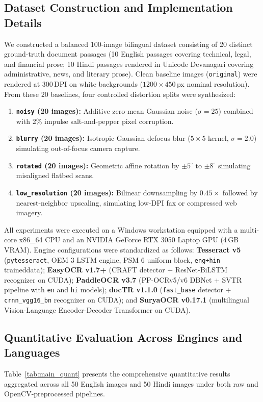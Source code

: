 \documentclass[11pt,a4paper]{article}
\begin{document}
\subsection{Dataset Construction and Implementation Details}
We constructed a balanced 100-image bilingual dataset consisting of 20 distinct ground-truth document passages (10 English passages covering technical, legal, and financial prose; 10 Hindi passages rendered in Unicode Devanagari covering administrative, news, and literary prose). Clean baseline images (\texttt{original}) were rendered at 300\,DPI on white backgrounds ($1200 \times 450$\,px nominal resolution). From these 20 baselines, four controlled distortion splits were synthesized:
\begin{enumerate}[leftmargin=1.5em]
    \item \textbf{\texttt{noisy} (20 images):} Additive zero-mean Gaussian noise ($\sigma = 25$) combined with 2\% impulse salt-and-pepper pixel corruption.
    \item \textbf{\texttt{blurry} (20 images):} Isotropic Gaussian defocus blur ($5 \times 5$ kernel, $\sigma = 2.0$) simulating out-of-focus camera capture.
    \item \textbf{\texttt{rotated} (20 images):} Geometric affine rotation by $\pm 5^\circ$ to $\pm 8^\circ$ simulating misaligned flatbed scans.
    \item \textbf{\texttt{low\_resolution} (20 images):} Bilinear downsampling by $0.45\times$ followed by nearest-neighbor upscaling, simulating low-DPI fax or compressed web imagery.
\end{enumerate}

All experiments were executed on a Windows workstation equipped with a multi-core x86\_64 CPU and an NVIDIA GeForce RTX 3050 Laptop GPU (4\,GB VRAM). Engine configurations were standardized as follows: \textbf{Tesseract v5} (\texttt{pytesseract}, OEM 3 LSTM engine, PSM 6 uniform block, \texttt{eng+hin} traineddata); \textbf{EasyOCR v1.7+} (CRAFT detector + ResNet-BiLSTM recognizer on CUDA); \textbf{PaddleOCR v3.7} (PP-OCRv5/v6 DBNet + SVTR pipeline with \texttt{en} and \texttt{hi} models); \textbf{docTR v1.1.0} (\texttt{fast\_base} detector + \texttt{crnn\_vgg16\_bn} recognizer on CUDA); and \textbf{SuryaOCR v0.17.1} (multilingual Vision-Language Encoder-Decoder Transformer on CUDA).

\subsection{Quantitative Evaluation Across Engines and Languages}
Table~\ref{tab:main_quant} presents the comprehensive quantitative results aggregated across all 50 English images and 50 Hindi images under both raw and OpenCV-preprocessed pipelines.
\end{document}
